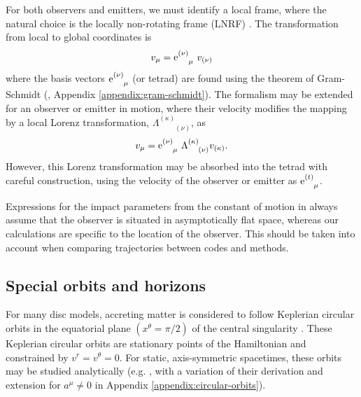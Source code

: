For both observers and emitters, we must identify a local frame, where the natural choice is the locally non-rotating frame (LNRF) \citep{bardeen_rotating_1972} . The transformation from local to global coordinates is
\begin{equation}
    \label{eq:local-to-global-velocity}
    v_\mu = \text{e}^{(\nu)}_{\phantom{(\nu)}\mu}\  v_{(\nu)}
\end{equation}
where the basis vectors $\text{e}^{(\nu)}_{\phantom{(\nu)}\mu}$ (or tetrad) are found using the theorem of Gram-Schmidt (\citealp{schmidt_uber_1989}, Appendix \ref{appendix:gram-schmidt}). The formalism may be extended for an observer or emitter in motion, where their velocity modifies the mapping by a local Lorenz transformation, $\Lambda^{(\kappa)}_{\phantom{(\kappa)}(\nu)}$, as 
\begin{equation}
    v_\mu = \text{e}^{(\nu)}_{\phantom{(\nu)}\mu}\  \Lambda^{(\kappa)}_{\phantom{(a)}(\nu)} v_{(\kappa)}.
\end{equation}
However, this Lorenz transformation may be absorbed into the tetrad with careful construction, using the velocity of the observer or emitter as $\utensor{\e}{(t)}{\mu}$.

Expressions for the impact parameters from the constant of motion in \cite{cunningham_optical_1973} always assume that the observer is situated in asymptotically flat space, whereas our calculations are specific to the location of the observer. This should be taken into account when comparing trajectories between codes and methods.

\subsection{Special orbits and horizons}
\label{sec:special-orbits}

For many disc models, accreting matter is considered to follow Keplerian circular orbits in the equatorial plane $(x^\theta = \pi/2)$ of the central singularity \citep{shakura_black_1973}. These Keplerian circular orbits are stationary points of the Hamiltonian and constrained by $v^r = v^\theta = 0$. For static, axis-symmetric spacetimes, these orbits may be studied analytically (e.g. \citealp{johannsen_regular_2013}, with a variation of their derivation and extension for $a^\mu \neq 0$ in Appendix \ref{appendix:circular-orbits}).

